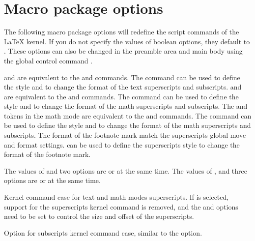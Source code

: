 \documentclass[load-preamble+]{cnltx-doc}
\begin{document}
\section{Macro package options}
The following macro package options will redefine the script commands of the \LaTeX{} kernel. If you do not specify the values of boolean options, they default to . These options can also be changed in the preamble area and main body using the global control command .
\begin{options}
   and  are equivalent to the  and  commands. The command  can be used to define the style  and  to change the format of the text superscripts and subscripts.
   and  are equivalent to the  and  commands. The command  can be used to define the style  and  to change the format of the math superscripts and subscripts.
  The \code{\^{}} and \code{\_{}} tokens in the math mode are equivalent to the  and  commands. The command  can be used to define the style  and  to change the format of the math superscripts and subscripts.
  The format of the footnote mark match the superscripts global move and format settings.  can be used to define the superscripts style  to change the format of the footnote mark.
  \begin{example}
  \end{example}
  The values of  and  two options are  or  at the same time.
  The values of ,  and  three options are  or  at the same time.
  \begin{example}
  \usepackage[both]{spbmark}
  \usepackage[text,foot=true]{spbmark}
  \end{example}
  Kernel command case for text and math modes superscripts. If  is selected, support for the superscripts kernel command is removed, and the  and  options need to be set to control the size and offset of the superscripts.
  \begin{example}
  \usepackage[spcore=none]{spbmark}
  \usepackage{graphicx}
  \end{example}
  Option for subscripts kernel command case, similar to the  option.
\end{options}
\end{document}
